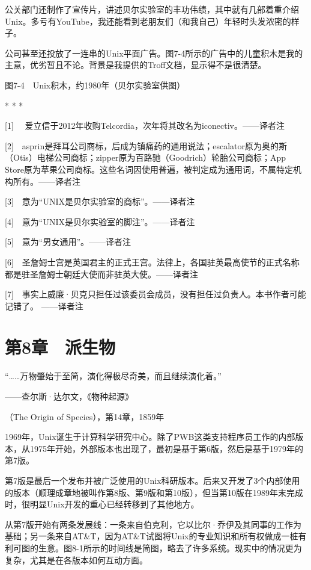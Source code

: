 \documentclass[a4paper,12pt,UTF8,twoside]{ctexbook}
\begin{document}
公关部门还制作了宣传片，讲述贝尔实验室的丰功伟绩，其中就有几部着重介绍Unix。多亏有YouTube，我还能看到老朋友们（和我自己）年轻时头发浓密的样子。

公司甚至还投放了一连串的Unix平面广告。图7-4所示的广告中的儿童积木是我的主意，优劣暂且不论。背景是我提供的Troff文档，显示得不是很清楚。



图7-4　Unix积木，约1980年（贝尔实验室供图）



* * *



[1]　 爱立信于2012年收购Telcordia，次年将其改名为iconectiv。——译者注

[2]　asprin是拜耳公司商标，后成为镇痛药的通用说法；escalator原为奥的斯（Otis）电梯公司商标；zipper原为百路驰（Goodrich）轮胎公司商标；App Store原为苹果公司商标。这些名词因使用普遍，被判定成为通用词，不属特定机构所有。——译者注

[3]　意为“UNIX是贝尔实验室的商标”。——译者注

[4]　意为“UNIX是贝尔实验室的脚注”。——译者注

[5]　意为“男女通用”。——译者注

[6]　圣詹姆士宫是英国君主的正式王宫。法律上，各国驻英最高使节的正式名称都是驻圣詹姆士朝廷大使而非驻英大使。——译者注

[7]　事实上威廉·贝克只担任过该委员会成员，没有担任过负责人。本书作者可能记错了。 ——译者注





\chapter{第8章　派生物}


“……万物肇始于至简，演化得极尽奇美，而且继续演化着。”

——查尔斯·达尔文，《物种起源》

（The Origin of Species），第14章，1859年

1969年，Unix诞生于计算科学研究中心。除了PWB这类支持程序员工作的内部版本，从1975年开始，外部版本也出现了，最初是基于第6版，然后是基于1979年的第7版。

第7版是最后一个发布并被广泛使用的Unix科研版本。后来又开发了3个内部使用的版本（顺理成章地被叫作第8版、第9版和第10版），但当第10版在1989年末完成时，很明显Unix开发的重心已经转移到了其他地方。

从第7版开始有两条发展线：一条来自伯克利，它以比尔·乔伊及其同事的工作为基础；另一条来自AT\&T，因为AT\&T试图将Unix的专业知识和所有权做成一桩有利可图的生意。图8-1所示的时间线是简图，略去了许多系统。现实中的情况更为复杂，尤其是在各版本如何互动方面。
\end{document}

